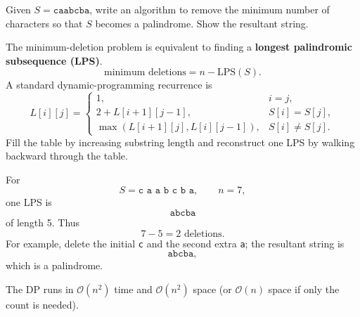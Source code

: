 \documentclass[11pt,a4paper]{article}
\newcommand{\Oh}{\mathcal{O}}
\begin{document}
\begin{qaquestion}
Given \(S=\texttt{caabcba}\), write an algorithm to remove the minimum number of characters so that \(S\) becomes a palindrome. Show the resultant string.
\end{qaquestion}
\begin{qaanswer}[Answer 4(c)]
The minimum-deletion problem is equivalent to finding a \textbf{longest palindromic subsequence (LPS)}.
\[
\boxed{\text{minimum deletions}=n-\mathrm{LPS}(S)}.
\]
A standard dynamic-programming recurrence is
\[
L[i][j]=
\begin{cases}
1, & i=j,\\
2+L[i+1][j-1], & S[i]=S[j],\\
\max(L[i+1][j],L[i][j-1]), & S[i]\ne S[j].
\end{cases}
\]
Fill the table by increasing substring length and reconstruct one LPS by walking backward through the table.

For
\[
S=\texttt{c a a b c b a},\qquad n=7,
\]
one LPS is
\[
\boxed{\texttt{abcba}}
\]
of length 5. Thus
\[
\boxed{7-5=2\text{ deletions}}.
\]
For example, delete the initial \texttt{c} and the second extra \texttt{a}; the resultant string is
\[
\boxed{\texttt{abcba}},
\]
which is a palindrome.

The DP runs in \(\Oh(n^2)\) time and \(\Oh(n^2)\) space (or \(\Oh(n)\) space if only the count is needed).
\end{qaanswer}
\end{document}
